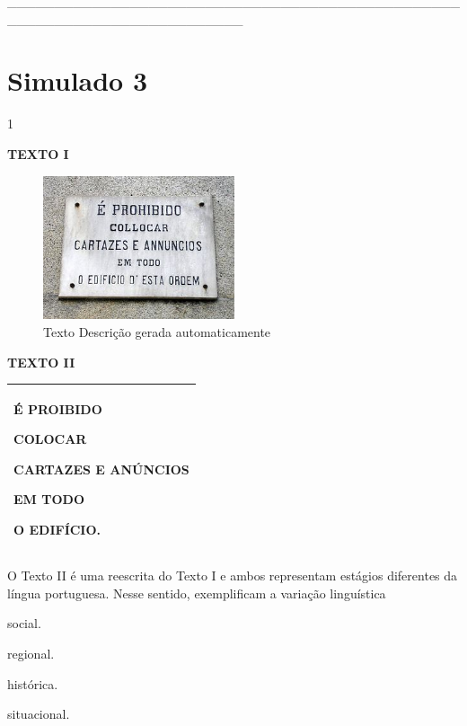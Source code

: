 \_\_\_\_\_\_\_\_\_\_\_\_\_\_\_\_\_\_\_\_\_\_\_\_\_\_\_\_\_\_\_\_\_\_\_\_\_\_\_\_\_\_\_\_\_\_\_\_\_\_\_\_\_\_\_\_\_\_\_\_\_\_\_\_\_\_\_\_\_\_\_\_\_

\section{Simulado 3}

\num{1}

\textbf{TEXTO I}

\begin{figure}
\centering
\includegraphics[width=2.21875in,height=1.66591in]{./imgSAEB_8_POR/media/image37.jpeg}
\caption{Texto Descrição gerada automaticamente}
\end{figure}


\textbf{TEXTO II}

\begin{longtable}[]{@{}l@{}}
\toprule
\endhead
\begin{minipage}[t]{0.30\columnwidth}\raggedright
É PROIBIDO

COLOCAR

CARTAZES E ANÚNCIOS

EM TODO

O EDIFÍCIO.\strut
\end{minipage}\tabularnewline
\bottomrule
\end{longtable}


O Texto II é uma reescrita do Texto I e ambos representam estágios
diferentes da língua portuguesa. Nesse sentido, exemplificam a variação
linguística

\begin{escolha}
\item
  social.
\item
  regional.
\item
  histórica.
\item
  situacional.
\end{escolha}

